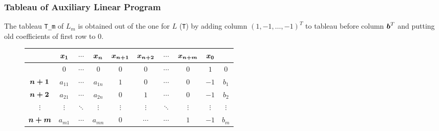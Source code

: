 \documentclass[32pt, aspectratio = 169]{beamer}
\begin{document}
\begin{frame}
  \frametitle{Tableau of Auxiliary Linear Program}
  The tableau \texttt{T_m} of $L_m$ is obtained out of the
  one for $L$ (\texttt{T}) by adding column
  $(1, -1, \ldots, -1)^T$ to tableau before column $\boldsymbol{b}^T$ and
  putting old coefficients of first row to $0$.
  \begin{figure}
    \begin{tabular}{c|ccc|ccccc|c|}
      & \alert{$\boldsymbol{x_1}$} & \alert{$\cdots$} & \alert{$\boldsymbol{x_n}$} & \alert{$\boldsymbol{x_{n+1}}$} & \alert{$\boldsymbol{x_{n+2}}$} & \alert{$\cdots$} & \alert{$\boldsymbol{x_{n+m}}$} & \alert{$\boldsymbol{x_0}$} &  \\
      \hline
      & $0$ & $\cdots$ & $0$ & $0$ & $0$ & $\cdots$ & $0$ & $1$ & $0$ \\
      \hline
      \alert{$\boldsymbol{n+1}$} & $a_{11}$ & $\cdots$ & $a_{1n}$ & $1$ & $0$ & $\cdots$ & $0$ & $-1$ & $b_1$ \\
      \alert{$\boldsymbol{n+2}$}& $a_{21}$ & $\cdots$ & $a_{2n}$ & $0$ & $1$ & $\cdots$ & $0$ & $-1$ & $b_2$ \\
      \alert{$\vdots$}& $\vdots$ & $\ddots$ & $\vdots$ & $\vdots$ & $\vdots$ & $\ddots$ & $\vdots$ & $\vdots$ & $\vdots$ \\
      \alert{$\boldsymbol{n+m}$} & $a_{m1}$ & $\cdots$  & $a_{mn}$  & $0$ & $\cdots$ & $\cdots$ & $1$ & $-1$ & $b_m$
    \end{tabular}
  \end{figure}
\end{frame}
\end{document}
